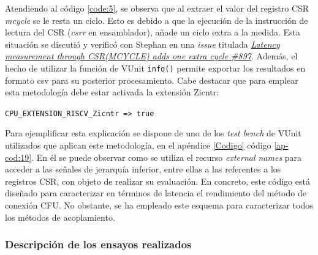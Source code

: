 Atendiendo al código \ref{code:5}, se observa que al extraer el valor del registro CSR \textit{mcycle} se le resta un ciclo.
Esto es debido a que la ejecución de la instrucción de lectura del CSR (\textit{csrr} en ensamblador), añade un ciclo extra a la medida.
Esta situación se discutió y verificó con Stephan en una \textit{issue} titulada \href{https://github.com/stnolting/neorv32/issues/897}{\textit{Latency measurement through CSR(MCYCLE) adds one extra cycle \#897}}.
Además, el hecho de utilizar la función de VUnit \texttt{info()} permite exportar los resultados en formato csv para su posterior procesamiento.
Cabe destacar que para emplear esta metodología debe estar activada la extensión Zicntr:

\hspace{32mm} \texttt{CPU_EXTENSION_RISCV_Zicntr => true} 

Para ejemplificar esta explicación se dispone de uno de los \textit{test bench} de VUnit utilizados que aplican este metodología, en el apéndice \ref{Codigo} código \ref{ap-cod:19}.
En él se puede observar como se utiliza el recurso \textit{external names} para acceder a las señales de jerarquía inferior, entre ellas a las referentes a los registros CSR, con objeto de realizar su evaluación.
En concreto, este código está diseñado para caracterizar en términos de latencia el rendimiento del método de conexión CFU.
No obstante, se ha empleado este esquema para caracterizar todos los métodos de acoplamiento.

%
%

\subsubsection{Descripción de los ensayos realizados}

